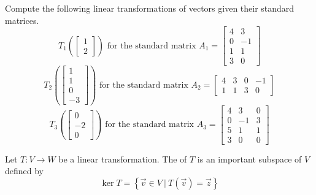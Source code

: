 \begin{activity}{15}
  Compute the following linear transformations of vectors given their
  standard matrices.
  \[
    T_1\left(\begin{bmatrix}1\\2\end{bmatrix}\right)
    \text{ for the standard matrix }
    A_1=\begin{bmatrix}4&3\\0&-1\\1&1\\3&0\end{bmatrix}
  \]
  \[
    T_2\left(\begin{bmatrix}1\\1\\0\\-3\end{bmatrix}\right)
    \text{ for the standard matrix }
    A_2=\begin{bmatrix}4&3&0&-1\\1&1&3&0\end{bmatrix}
  \]
  \[
    T_3\left(\begin{bmatrix}0\\-2\\0\end{bmatrix}\right)
    \text{ for the standard matrix }
    A_3=\begin{bmatrix}4&3&0\\0&-1&3\\5&1&1\\3&0&0\end{bmatrix}
  \]
\end{activity}


\begin{definition}
Let \(T: V \rightarrow W\) be a linear transformation.  The  of \(T\)
is an important subspace of \(V\) defined by
\[
\ker T = \left\{ \vec{v} \in V\ \big|\ T(\vec{v})=\vec{z}\right\}
\]

\begin{center}
\end{center}
\end{definition}

